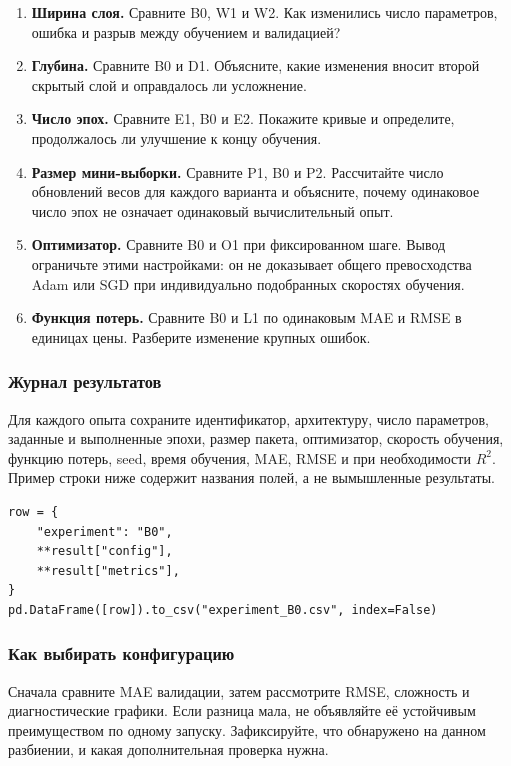 \begin{enumerate}
\item \textbf{Ширина слоя.} Сравните B0, W1 и W2. Как изменились число
параметров, ошибка и разрыв между обучением и валидацией?
\item \textbf{Глубина.} Сравните B0 и D1. Объясните, какие изменения
вносит второй скрытый слой и оправдалось ли усложнение.
\item \textbf{Число эпох.} Сравните E1, B0 и E2. Покажите кривые
и определите, продолжалось ли улучшение к концу обучения.
\item \textbf{Размер мини-выборки.} Сравните P1, B0 и P2.
Рассчитайте число обновлений весов для каждого варианта и объясните,
почему одинаковое число эпох не означает одинаковый вычислительный опыт.
\item \textbf{Оптимизатор.} Сравните B0 и O1 при фиксированном шаге.
Вывод ограничьте этими настройками: он не доказывает общего превосходства
Adam или SGD при индивидуально подобранных скоростях обучения.
\item \textbf{Функция потерь.} Сравните B0 и L1 по одинаковым MAE
и RMSE в единицах цены. Разберите изменение крупных ошибок.
\end{enumerate}

\subsubsection*{Журнал результатов}
Для каждого опыта сохраните идентификатор, архитектуру, число параметров,
заданные и выполненные эпохи, размер пакета, оптимизатор, скорость
обучения, функцию потерь, seed, время обучения, MAE, RMSE и при
необходимости \(R^2\). Пример строки ниже содержит названия полей,
а не вымышленные результаты.

\begin{lstlisting}
row = {
    "experiment": "B0",
    **result["config"],
    **result["metrics"],
}
pd.DataFrame([row]).to_csv("experiment_B0.csv", index=False)
\end{lstlisting}

\subsubsection*{Как выбирать конфигурацию}
Сначала сравните MAE валидации, затем рассмотрите RMSE, сложность и
диагностические графики. Если разница мала, не объявляйте её устойчивым
преимуществом по одному запуску. Зафиксируйте, что обнаружено на данном
разбиении, и какая дополнительная проверка нужна.

